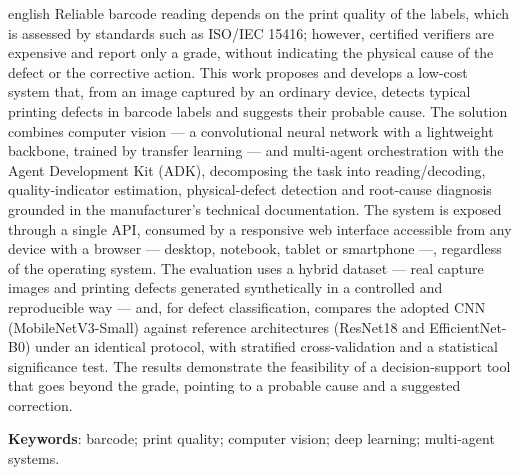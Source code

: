 \documentclass[
	article,			%
	11pt,				%
	oneside,			%
	a4paper,			%
	english,			%
	brazilian,			%
	sumario=tradicional
	]{abntex2}
\begin{document}
\begin{resumoumacoluna}[Abstract]
\begin{otherlanguage*}{english}
Reliable barcode reading depends on the print quality of the labels, which is
assessed by standards such as ISO/IEC 15416; however, certified verifiers are
expensive and report only a grade, without indicating the physical cause of the
defect or the corrective action. This work proposes and develops a low-cost
system that, from an image captured by an ordinary device, detects typical
printing defects in barcode labels and suggests their probable cause. The
solution combines computer vision --- a convolutional neural network with a
lightweight backbone, trained by transfer learning --- and multi-agent
orchestration with the Agent Development Kit (ADK), decomposing the task into
reading/decoding, quality-indicator estimation, physical-defect detection and
root-cause diagnosis grounded in the manufacturer's technical documentation. The
system is exposed through a single API, consumed by a responsive web interface
accessible from any device with a browser --- desktop, notebook, tablet or
smartphone ---, regardless of the operating system. The evaluation uses a hybrid
dataset --- real capture images and printing defects generated synthetically in a
controlled and reproducible way --- and, for defect classification, compares the
adopted CNN (MobileNetV3-Small) against reference architectures (ResNet18 and
EfficientNet-B0) under an identical protocol, with stratified cross-validation and
a statistical significance test. The results demonstrate the feasibility of a
decision-support tool that goes beyond the grade, pointing to a probable cause and
a suggested correction.

\noindent
\textbf{Keywords}: barcode; print quality; computer vision; deep learning;
multi-agent systems.
\end{otherlanguage*}
\end{resumoumacoluna}

\tableofcontents*
\newpage

\textual

\end{document}
